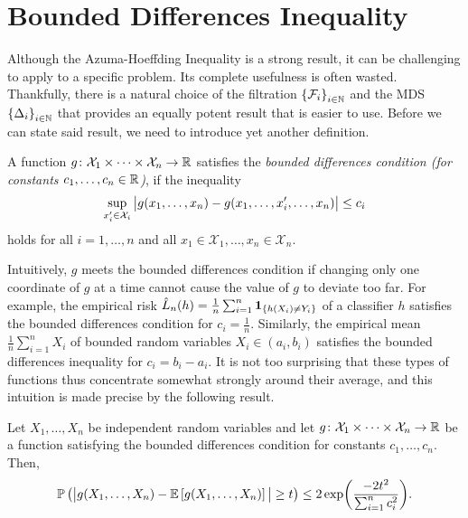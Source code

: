 \section{Bounded Differences Inequality}

Although the Azuma-Hoeffding Inequality is a strong result, it can be challenging to apply to a specific problem. Its complete usefulness is often wasted. Thankfully, there is a natural choice of the filtration $\left\{\mathcal{F}_i\right\}_{i\in\mathbb{N}}$ and the MDS $\left\{\Delta_i\right\}_{i\in\mathbb{N}}$ that provides an equally potent result that is easier to use. Before we can state said result, we need to introduce yet another definition.

\begin{definition}
A function $g \colon \mathcal{X}_1 \times \dots \times \mathcal{X}_n \to \mathbb{R}$ satisfies the \emph{bounded differences condition (for constants $c_1, \dots, c_n \in \mathbb{R}$)}, if the inequality
\[
    \sup_{x_i' \in \mathcal{X}_i} \big\lvert g(x_1, \dots, x_n) - g(x_1, \dots, x_i', \dots, x_n) \big\rvert \leq c_i
\]
holds for all $i = 1, \dots, n$ and all $x_1 \in \mathcal{X}_1, \dots, x_n \in \mathcal{X}_n$.
\end{definition}

Intuitively, $g$ meets the bounded differences condition if changing only one coordinate of $g$ at a time cannot cause the value of $g$ to deviate too far. For example, the empirical risk $\hat L_n(h) = \frac{1}{n} \sum_{i=1}^n \mathbf{1}_{\left\{h(X_i) \neq Y_i\right\}}$ of a classifier $h$ satisfies the bounded differences condition for $c_i = \frac{1}{n}$. Similarly, the empirical mean $\frac{1}{n} \sum_{i=1}^n X_i$ of bounded random variables $X_i \in (a_i, b_i)$ satisfies the bounded differences inequality for $c_i = b_i - a_i$. It is not too surprising that these types of functions thus concentrate somewhat strongly around their average, and this intuition is made precise by the following result.

\begin{theorem}
\label{thm: bounded differences inequality}
Let $X_1, \dots, X_n$ be independent random variables and let $g \colon \mathcal{X}_1 \times \dots \times \mathcal{X}_n \to \mathbb{R}$ be a function satisfying the bounded differences condition for constants $c_1, \dots, c_n$. Then,
\[
    \mathbb{P}\left(\big\lvert g(X_1, \dots, X_n) - \mathbb{E}\left[g(X_1, \dots, X_n)\right]\big\rvert \geq t \right) \leq 2 \exp(\frac{-2t^2}{\sum_{i=1}^n c_i^2}).
\]
\end{theorem}


